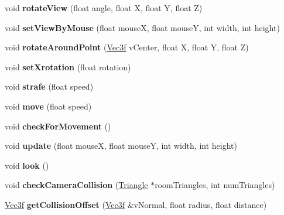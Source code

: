 \begin{DoxyCompactItemize}
\mbox{\label{class_f_p_s_camera_a7a4ade212677a3f6da321f1dea7ab572}} 
void {\bfseries rotate\+View} (float angle, float X, float Y, float Z)
\item 
\mbox{\label{class_f_p_s_camera_ae596d38d60db97bdf617d5f2cfade10b}} 
void {\bfseries set\+View\+By\+Mouse} (float mouseX, float mouseY, int width, int height)
\item 
\mbox{\label{class_f_p_s_camera_aeddf4e5206e4c2f4ef44bc7cbcb68776}} 
void {\bfseries rotate\+Around\+Point} (\hyperlink{struct_vec3f}{Vec3f} v\+Center, float X, float Y, float Z)
\item 
\mbox{\label{class_f_p_s_camera_a5dfb63b3f68c9682444011b60c1c998c}} 
void {\bfseries set\+Xrotation} (float rotation)
\item 
\mbox{\label{class_f_p_s_camera_a6298cea0150128aab9b71db46b33c7b6}} 
void {\bfseries strafe} (float speed)
\item 
\mbox{\label{class_f_p_s_camera_a6a0cac90ac9fcfaef12fe16bad8ed24d}} 
void {\bfseries move} (float speed)
\item 
\mbox{\label{class_f_p_s_camera_a1792fa28fa33dd6efda48f13b7b610dd}} 
void {\bfseries check\+For\+Movement} ()
\item 
\mbox{\label{class_f_p_s_camera_a738560c0c908cf654776cbad1264e493}} 
void {\bfseries update} (float mouseX, float mouseY, int width, int height)
\item 
\mbox{\label{class_f_p_s_camera_a2ccca2c82f14e38b4fd32875a7e9da25}} 
void {\bfseries look} ()
\item 
\mbox{\label{class_f_p_s_camera_a503e4704b8858062f10e7aedd091d3c9}} 
void {\bfseries check\+Camera\+Collision} (\hyperlink{class_triangle}{Triangle} $\ast$room\+Triangles, int num\+Triangles)
\item 
\mbox{\label{class_f_p_s_camera_a32904ec6c5592810188db68cd9c13a52}} 
\hyperlink{struct_vec3f}{Vec3f} {\bfseries get\+Collision\+Offset} (\hyperlink{struct_vec3f}{Vec3f} \&v\+Normal, float radius, float distance)
\end{DoxyCompactItemize}

